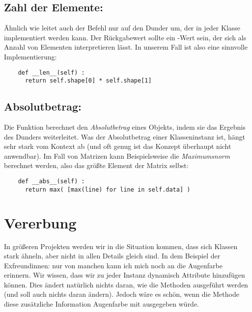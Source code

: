 \subsection{Zahl der Elemente: }
Ähnlich wie  leitet auch der Befehl  nur auf den Dunder  um, der in jeder Klasse implementiert werden kann. Der Rückgabewert sollte ein -Wert sein, der sich als Anzahl von Elementen interpretieren lässt. In unserem Fall ist also eine sinnvolle Implementierung:

\begin{codebox}
\begin{verbatim}
    def __len__(self) :
      return self.shape[0] * self.shape[1]
\end{verbatim}
\end{codebox}


\subsection{Absolutbetrag: }
Die Funktion  berechnet den \emph{Absolutbetrag} eines Objekts, indem sie das Ergebnis des Dunders  weiterleitet.
Was der Absolutbetrag einer Klasseninstanz ist, hängt sehr stark vom Kontext ab (und oft genug ist das Konzept überhaupt nicht anwendbar). Im Fall von Matrizen kann Beispielsweise die \emph{Maximumsnorm} berechnet werden, also das größte Element der Matrix selbst:

\begin{codebox}
\begin{verbatim}
    def __abs__(self) :
      return max( [max(line) for line in self.data] )
\end{verbatim}
\end{codebox}


\section{Vererbung}
\label{sec:Inheritance}
In größeren Projekten werden wir in die Situation kommen, dass sich Klassen stark ähneln, aber nicht in allen Details gleich sind. In dem Beispiel der Exfreundinnen: nur von manchen kann ich mich noch an die Augenfarbe erinnern. Wir wissen, dass wir zu jeder Instanz dynamisch Attribute hinzufügen können. Dies ändert natürlich nichts daran, wie die Methoden ausgeführt werden (und soll auch nichts daran ändern). Jedoch wäre es schön, wenn die Methode  diese zusätzliche Information Augenfarbe mit ausgegeben würde.

